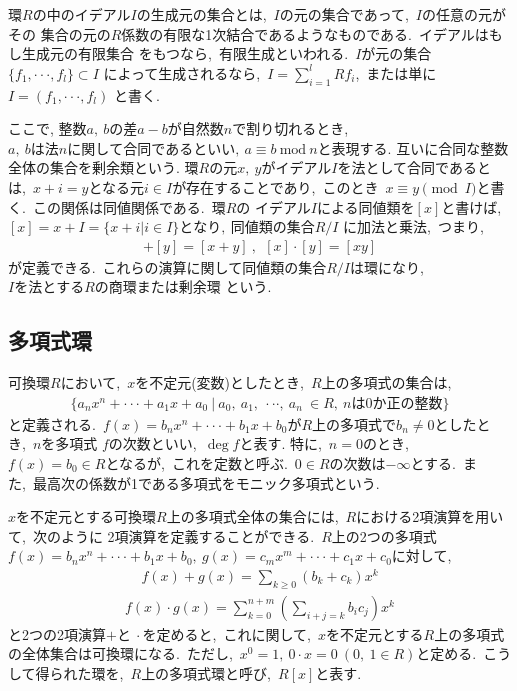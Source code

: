 環$R$の中のイデアル$I$の生成元の集合とは,\ $I$の元の集合であって,\ $I$の任意の元がその
集合の元の$R$係数の有限な1次結合であるようなものである.\ イデアルはもし生成元の有限集合
をもつなら,\ 有限生成といわれる.\ $I$が元の集合$\{f_1,\cdot\cdot\cdot,f_l\} \subset I$
によって生成されるなら,\ $\displaystyle I=\sum_{i=1}^{l}Rf_i$,\ または単に$I=(f_1,\cdot\cdot\cdot,f_l)$
と書く.\ 


ここで, 整数$a,\ b$の差$a-b$が自然数$n$で割り切れるとき, $a,\ bは法nに関して合同であるといい,\ a \equiv b \ \mbox{mod} \ n$と表現する. 互いに合同な整数全体の集合を剰余類という. 
環$R$の元$x,\ y$がイデアル$I$を法として合同であるとは,\ $x+i=y$となる元$i \in I$が存在することであり,\ このとき\ $x \equiv y \pmod{I}$と書く.\ この関係は同値関係である.\ 環$R$の
イデアル$I$による同値類を$[x]$と書けば,\ $[x]=x+I=\{x+i|i \in I\}となり,\ 同値類の集合R/I$
に加法と乗法,\ つまり, 
\begin{eqnarray}
 [x]+[y]=[x+y] \ ,\ \ [x]\cdot[y]=[xy]
\end{eqnarray}
が定義できる.\ これらの演算に関して同値類の集合$R/I$は環になり,\ $Iを法とするRの商環または剰余環$
という. 

\bigskip


\subsection{多項式環}
可換環$R$において,\ $x$を不定元(変数)としたとき,\ $R上の多項式の集合$は,\ 
\begin{eqnarray}
\{a_nx^n+ \cdot\cdot\cdot+a_1x+a_0\ |\ a_0,\ a_1,\ \cdot\cdot\cdot,\ a_n\ \in R,\ nは0か正の整数\}
\end{eqnarray}
と定義される.\ $f(x)=b_nx^n+ \cdot\cdot\cdot+b_1x+b_0がR上の多項式$で$b_n \neq 0$としたとき,\ $n$を多項式
$f$の次数といい,\ $\deg f$と表す. 特に,\ $n=0$のとき,\ $f(x)=b_0 \in R$となるが,\ これを定数と呼ぶ.\ 
$0 \in R$の次数は$-\infty$とする.\ また,\ 最高次の係数が1である多項式をモニック多項式という.\ 


$xを不定元とする可換環R$上の多項式全体の集合には,\ $R$における2項演算を用いて,\ 次のように
2項演算を定義することができる.\ $R$上の2つの多項式$f(x)=b_nx^n+ \cdot\cdot\cdot+b_1x+b_0,\ g(x)=
c_mx^m+ \cdot\cdot\cdot+c_1x+c_0$に対して,\ 
\begin{eqnarray}
f(x)+g(x)=\sum_{k\geq0}(b_k+c_k)x^k
\end{eqnarray}
\begin{eqnarray}
f(x)\cdot g(x)=\sum_{k=0}^{n+m}(\sum_{i+j=k}b_ic_j)x^k
\end{eqnarray}
と2つの2項演算$+と\ \cdot$を定めると,\ これに関して,\ $x$を不定元とする$R$上の多項式
の全体集合は可換環になる.\ ただし,\ $x^0=1,\ 0\cdot x=0\ (0,\ 1\in R)$と定める.\ 
こうして得られた環を,\ $R$上の多項式環と呼び,\ $R[x]$と表す.


